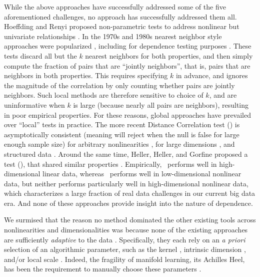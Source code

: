 \documentclass[11pt]{article}
\begin{document}
While the above approaches have successfully addressed some of the five aforementioned challenges,  no approach has successfully addressed them all.    Hoeffding and Renyi proposed non-parametric tests to address nonlinear but univariate relationships \cite{Hoeffding1948,Renyi1959}.  In the 1970s and 1980s nearest neighbor style approaches were popularized \cite{Stone1977}, including for dependence testing purposes \cite{Friedman1983,Schilling1986}.  These tests discard all but the $k$ nearest neighbors for both properties, and then simply compute the fraction of pairs that are ``jointly neighbors'', that is, pairs that are neighbors in both properties. This requires specifying $k$ in advance, and ignores the magnitude of the correlation by only counting whether pairs are jointly neighbors.  Such local methods are therefore sensitive to choice of $k$, and are uninformative  when $k$ is large (because nearly all pairs are neighbors), resulting in poor empirical properties.
For these reasons, global approaches have prevailed over ``local'' tests in practice.  The more recent Distance Correlation test (\Dcorr) is asymptotically consistent (meaning will reject when the null is false for large enough sample size) for arbitrary nonlinearities \cite{SzekelyRizzo2009}, for large dimensions \cite{SzekelyRizzo2013a}, and structured data \cite{Lyons2013}.
Around the same time, Heller, Heller, and Gorfine proposed a test (\Hhg), that shared similar properties \cite{HellerGorfine2013}.  Empirically, \Dcorr~performs well in high-dimensional linear data, whereas \Hhg~performs well in low-dimensional nonlinear data,
but neither performs particularly well in high-dimensional nonlinear data, which characterizes a large fraction of real data challenges in our current big data era. And none of these approaches provide insight into the nature of dependence.

We surmised that the reason no method dominated the other existing tools across nonlinearities and dimensionalities was because none of the existing approaches are sufficiently \emph{adaptive} to the data \cite{zhang2012adaptive}.  Specifically, they each rely on an \emph{a priori} selection of an algorithmic parameter, such as the kernel  \cite{scholkopf2002learning}, intrinsic dimension \cite{RoweisSaul2003}, and/or local scale \cite{Friedman1983,Schilling1986,Allard2012}. Indeed, the fragility of manifold learning, its Achilles Heel, has been the requirement to manually choose these parameters \cite{levina2004maximum}.
\end{document}
